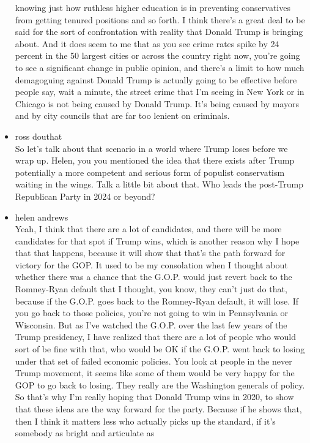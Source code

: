 \begin{itemize}
  knowing just how ruthless higher education is in preventing
  conservatives from getting tenured positions and so forth. I think
  there's a great deal to be said for the sort of confrontation with
  reality that Donald Trump is bringing about. And it does seem to me
  that as you see crime rates spike by 24 percent in the 50 largest
  cities or across the country right now, you're going to see a
  significant change in public opinion, and there's a limit to how much
  demagoguing against Donald Trump is actually going to be effective
  before people say, wait a minute, the street crime that I'm seeing in
  New York or in Chicago is not being caused by Donald Trump. It's being
  caused by mayors and by city councils that are far too lenient on
  criminals.
\item
  ross douthat\\
  So let's talk about that scenario in a world where Trump loses before
  we wrap up. Helen, you you mentioned the idea that there exists after
  Trump potentially a more competent and serious form of populist
  conservatism waiting in the wings. Talk a little bit about that. Who
  leads the post-Trump Republican Party in 2024 or beyond?
\item
  helen andrews\\
  Yeah, I think that there are a lot of candidates, and there will be
  more candidates for that spot if Trump wins, which is another reason
  why I hope that that happens, because it will show that that's the
  path forward for victory for the GOP. It used to be my consolation
  when I thought about whether there was a chance that the G.O.P. would
  just revert back to the Romney-Ryan default that I thought, you know,
  they can't just do that, because if the G.O.P. goes back to the
  Romney-Ryan default, it will lose. If you go back to those policies,
  you're not going to win in Pennsylvania or Wisconsin. But as I've
  watched the G.O.P. over the last few years of the Trump presidency, I
  have realized that there are a lot of people who would sort of be fine
  with that, who would be OK if the G.O.P. went back to losing under
  that set of failed economic policies. You look at people in the never
  Trump movement, it seems like some of them would be very happy for the
  GOP to go back to losing. They really are the Washington generals of
  policy. So that's why I'm really hoping that Donald Trump wins in
  2020, to show that these ideas are the way forward for the party.
  Because if he shows that, then I think it matters less who actually
  picks up the standard, if it's somebody as bright and articulate as

\end{itemize}
